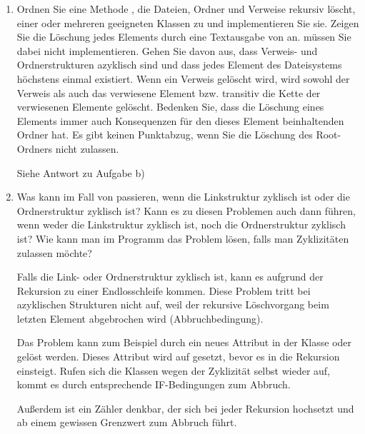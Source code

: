 \documentclass{lehramt-informatik-aufgabe}
\begin{document}
\begin{enumerate}

\item Ordnen Sie eine Methode , die Dateien, Ordner
und Verweise rekursiv löscht, einer oder mehreren geeigneten Klassen zu
und implementieren Sie sie. Zeigen Sie die Löschung jedes Elements durch
eine Textausgabe von  an. 
müssen Sie dabei nicht implementieren. Gehen Sie davon aus, dass
Verweis- und Ordnerstrukturen azyklisch sind und dass jedes Element des
Dateisystems höchstens einmal existiert. Wenn ein Verweis gelöscht wird,
wird sowohl der Verweis als auch das verwiesene Element bzw. transitiv
die Kette der verwiesenen Elemente gelöscht. Bedenken Sie, dass die
Löschung eines Elements immer auch Konsequenzen für den dieses Element
beinhaltenden Ordner hat. Es gibt keinen Punktabzug, wenn Sie die
Löschung des Root-Ordners nicht zulassen.

\begin{liAntwort}
Siehe Antwort zu Aufgabe b)
\end{liAntwort}


\item Was kann im Fall von  passieren,
wenn die Linkstruktur zyklisch ist oder die Ordnerstruktur zyklisch ist?
Kann es zu diesen Problemen auch dann führen, wenn weder die
Linkstruktur zyklisch ist, noch die Ordnerstruktur zyklisch ist? Wie
kann man im Programm das Problem lösen, falls man Zyklizitäten zulassen
möchte?

\begin{liAntwort}
Falls die Link- oder Ordnerstruktur zyklisch ist, kann es aufgrund der
Rekursion zu einer Endlosschleife kommen. Diese Problem tritt bei
azyklischen Strukturen nicht auf, weil der rekursive Löschvorgang beim
letzten Element abgebrochen wird (Abbruchbedingung).

Das Problem kann zum Beispiel durch ein neues Attribut
 in der Klasse  oder
 gelöst werden. Dieses Attribut wird auf
 gesetzt, bevor es in die Rekursion einsteigt. Rufen
sich die Klassen wegen der Zyklizität selbst wieder auf, kommt es durch
entsprechende IF-Bedingungen zum Abbruch.

Außerdem ist ein Zähler denkbar, der sich bei jeder Rekursion hochsetzt
und ab einem gewissen Grenzwert zum Abbruch führt.
\end{liAntwort}


\end{enumerate}
\end{document}
